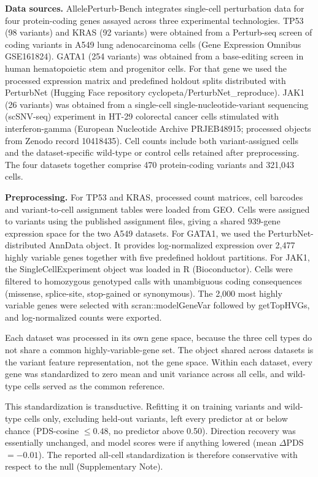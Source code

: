 \documentclass[11pt,letterpaper]{article}
\begin{document}
\textbf{Data sources.} AllelePerturb-Bench integrates single-cell perturbation data for four protein-coding genes assayed across three experimental technologies. TP53 (98 variants) and KRAS (92 variants) were obtained from a Perturb-seq screen of coding variants in A549 lung adenocarcinoma cells (Gene Expression Omnibus GSE161824)\cite{Ursu2022}. GATA1 (254 variants) was obtained from a base-editing screen in human hematopoietic stem and progenitor cells. For that gene we used the processed expression matrix and predefined holdout splits distributed with PerturbNet\cite{PerturbNet} (Hugging Face repository cyclopeta/PerturbNet\_reproduce). JAK1 (26 variants) was obtained from a single-cell single-nucleotide-variant sequencing (scSNV-seq) experiment in HT-29 colorectal cancer cells stimulated with interferon-gamma (European Nucleotide Archive PRJEB48915; processed objects from Zenodo record 10418435)\cite{Cooper2024}. Cell counts include both variant-assigned cells and the dataset-specific wild-type or control cells retained after preprocessing. The four datasets together comprise 470 protein-coding variants and 321,043 cells.

\textbf{Preprocessing.} For TP53 and KRAS, processed count matrices, cell barcodes and variant-to-cell assignment tables were loaded from GEO. Cells were assigned to variants using the published assignment files, giving a shared 939-gene expression space for the two A549 datasets. For GATA1, we used the PerturbNet-distributed AnnData object. It provides log-normalized expression over 2,477 highly variable genes together with five predefined holdout partitions. For JAK1, the SingleCellExperiment object was loaded in R (Bioconductor). Cells were filtered to homozygous genotyped calls with unambiguous coding consequences (missense, splice-site, stop-gained or synonymous). The 2,000 most highly variable genes were selected with scran::modelGeneVar followed by getTopHVGs, and log-normalized counts were exported.

Each dataset was processed in its own gene space, because the three cell types do not share a common highly-variable-gene set. The object shared across datasets is the variant feature representation, not the gene space. Within each dataset, every gene was standardized to zero mean and unit variance across all cells, and wild-type cells served as the common reference.

This standardization is transductive. Refitting it on training variants and wild-type cells only, excluding held-out variants, left every predictor at or below chance (PDS-cosine $\le 0.48$, no predictor above 0.50). Direction recovery was essentially unchanged, and model scores were if anything lowered (mean $\Delta$PDS $=-0.01$). The reported all-cell standardization is therefore conservative with respect to the null (Supplementary Note).
\end{document}
